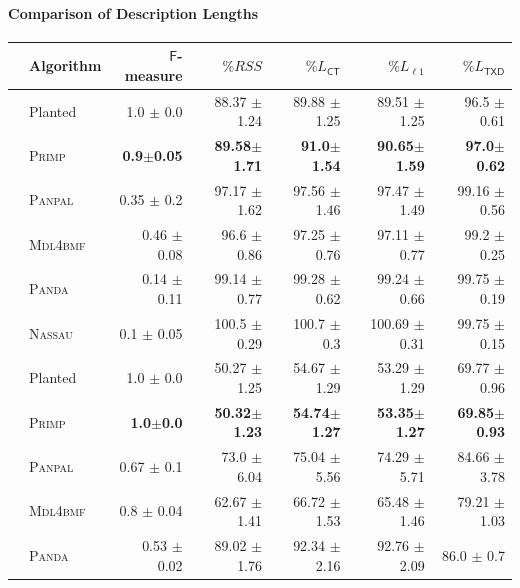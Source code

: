 \paragraph{Comparison of Description Lengths}
\begin{table}%
	\centering
    \begin{adjustbox}{max width=\textwidth}
	\begin{tabular}{clrrrrr}\toprule
 & Algorithm & $\mathsf{F}$-measure & $\%RSS$ & $\%L_{\mathsf{CT}}$ & $\%L_{\ell 1}$  & $\%L_{\mathsf{TXD}}$  \\ \midrule
 \rowcolor{black!10}
\multirow{6}{*}{\cellcolor{white}\rotatebox{90}{ $p_\pm^*=25\%$ }  } 
&Planted& 1.0 $\pm$ 0.0 & 88.37 $\pm$ 1.24 & 89.88 $\pm$ 1.25 & 89.51 $\pm$ 1.25 & 96.5 $\pm$ 0.61\\
 & \textsc{Primp} & \textbf{0.9}$\pm$\textbf{0.05} & \textbf{89.58}$\pm$\textbf{1.71} & \textbf{91.0}$\pm$\textbf{1.54} & \textbf{90.65}$\pm$\textbf{1.59} & \textbf{97.0}$\pm$\textbf{0.62}\\
 & \textsc{Panpal} & 0.35 $\pm$ 0.2 & 97.17 $\pm$ 1.62 & 97.56 $\pm$ 1.46 & 97.47 $\pm$ 1.49 & 99.16 $\pm$ 0.56\\
 & \textsc{Mdl4bmf} & 0.46 $\pm$ 0.08 & 96.6 $\pm$ 0.86 & 97.25 $\pm$ 0.76 & 97.11 $\pm$ 0.77 & 99.2 $\pm$ 0.25\\
 & \textsc{Panda} & 0.14 $\pm$ 0.11 & 99.14 $\pm$ 0.77 & 99.28 $\pm$ 0.62 & 99.24 $\pm$ 0.66 & 99.75 $\pm$ 0.19\\
 & \textsc{Nassau} & 0.1 $\pm$ 0.05 & 100.5 $\pm$ 0.29 & 100.7 $\pm$ 0.3 & 100.69 $\pm$ 0.31 & 99.75 $\pm$ 0.15\\
 \midrule
\rowcolor{black!10}
\multirow{6}{*}{\cellcolor{white}\rotatebox{90}{ $r^* = 45$ }  }  
& Planted & 1.0 $\pm$ 0.0 &  50.27 $\pm$ 1.25 & 54.67 $\pm$ 1.29 & 53.29 $\pm$ 1.29 & 69.77 $\pm$ 0.96\\
 & \textsc{Primp} & \textbf{1.0}$\pm$\textbf{0.0} & \textbf{50.32}$\pm$\textbf{1.23} & \textbf{54.74}$\pm$\textbf{1.27} & \textbf{53.35}$\pm$\textbf{1.27} & \textbf{69.85}$\pm$\textbf{0.93}\\
 & \textsc{Panpal} & 0.67 $\pm$ 0.1 & 73.0 $\pm$ 6.04 & 75.04 $\pm$ 5.56 & 74.29 $\pm$ 5.71 & 84.66 $\pm$ 3.78\\
 & \textsc{Mdl4bmf} & 0.8 $\pm$ 0.04 & 62.67 $\pm$ 1.41 & 66.72 $\pm$ 1.53 & 65.48 $\pm$ 1.46 & 79.21 $\pm$ 1.03\\
 & \textsc{Panda} & 0.53 $\pm$ 0.02 & 89.02 $\pm$ 1.76 & 92.34 $\pm$ 2.16 & 92.76 $\pm$ 2.09 & 86.0 $\pm$ 0.7\\

\end{tabular}
\end{adjustbox}
\end{table}
